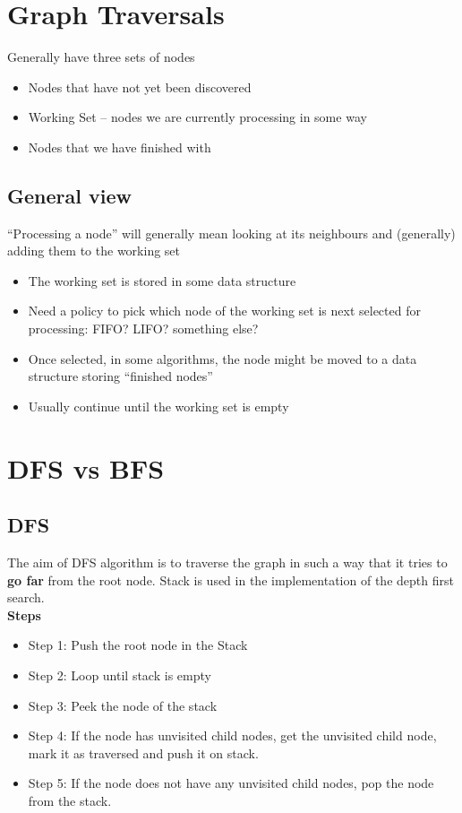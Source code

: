 \documentclass{article}
\begin{document}
\section{Graph Traversals}
\begin{flushleft}
	Generally have three sets of nodes
	\begin{itemize}
		\item Nodes that have not yet been discovered
		\item Working Set – nodes we are currently processing in some way 
		\item Nodes that we have finished with
	\end{itemize}
\end{flushleft}

\subsection{General view}
\begin{flushleft}
“Processing a node” will generally mean looking at its neighbours and (generally) adding them to the working set
	\begin{itemize}
		\item The working set is stored in some data structure
		\item Need a policy to pick which node of the working set is next selected for processing: FIFO? LIFO? something else?
		\item Once selected, in some algorithms, the node might be moved to a data structure storing “finished nodes”
		\item Usually continue until the working set is empty
	\end{itemize}
\end{flushleft}

\section{DFS vs BFS}
\subsection{DFS}
\begin{flushleft}
The aim of DFS algorithm is to traverse the graph in such a way that it tries to \textbf{go far} from the root node. Stack is used in the implementation of the depth first search.\\
\textbf{Steps}
	\begin{itemize}
		\item Step 1: Push the root node in the Stack
		\item Step 2: Loop until stack is empty
		\item Step 3: Peek the node of the stack
		\item Step 4: If the node has unvisited child nodes, get the unvisited child node, mark it as traversed and push it on stack.
		\item Step 5: If the node does not have any unvisited child nodes, pop the node from the stack.
	\end{itemize}
\end{flushleft}
\end{document}
